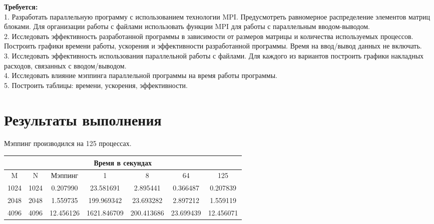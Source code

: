 \documentclass[12pt]{article}
\begin{document}
        \textbf{Требуется:} \\
        1. Разработать параллельную программу с использованием технологии MPI.
        Предусмотреть равномерное распределение элементов матриц блоками. Для
        организации работы с файлами использовать функции MPI для работы с
        параллельным вводом-выводом. \\
        2. Исследовать эффективность разработанной программы в зависимости от размеров
        матрицы и количества используемых процессов. Построить графики времени работы,
        ускорения и эффективности разработанной программы. Время на ввод/вывод данных
        не включать. \\
        3. Исследовать эффективность использования параллельной работы с файлами. Для
        каждого из вариантов построить графики накладных расходов, связанных с
        вводом/выводом. \\
        4. Исследовать влияние мэппинга параллельной программы на время работы
        программы. \\
        5. Построить таблицы: времени, ускорения, эффективности.

    \section{Результаты выполнения}
        Мэппинг производился на 125 процессах.
        \begin{center}
            \begin{tabular}{|c|c|c|c|c|c|c|}
                \hline
                \multicolumn{7}{|c|}{Время в секундах} \\
                \hline
                M & N & Мэппинг & 1 & 8 & 64 & 125 \\
                \hline
                1024 & 1024 & 0.207990 & 23.581691 & 2.895441 & 0.366487 & 0.207839 \\
                \hline
                2048 & 2048 & 1.559735 & 199.969342 & 23.693282 & 2.897212 & 1.559119 \\
                \hline
                4096 & 4096 & 12.456126 & 1621.846709 & 200.413686 & 23.699439 & 12.456071 \\
                \hline
            \end{tabular}
        \end{center}
\end{document}
